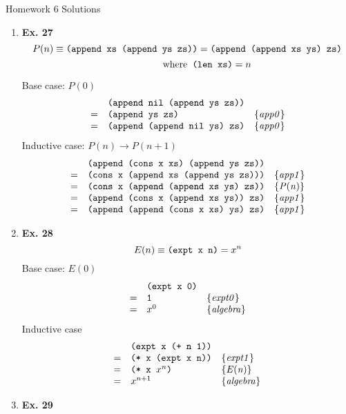 \documentclass[fleqn]{article}
\newenvironment{proof}
  {\[\begin{array}{lll}}
  {\end{array}\]}
\newcommand{\law}[1]{\{\mathit{#1}\}}
\renewcommand{\c}[1]{\mbox{\texttt{#1}}}
\begin{document}
  \begin{center}
    {\Large Homework 6 Solutions}
  \end{center}
  \begin{enumerate}
    \item {\bf Ex. 27}
      \[ P(n) \equiv \c{(append xs (append ys zs))} =
                     \c{(append (append xs ys) zs)} \]
                     \[ \qquad \qquad \mathrm{where} \c{ (len xs)} = n \]

      Base case: $P(0)$
      \begin{proof}
          & \c{(append nil (append ys zs))} & \\
        = & \c{(append ys zs)} & \law{app0} \\
        = & \c{(append (append nil ys) zs)} & \law{app0} \\
      \end{proof}
      Inductive case: $P(n) \to P(n + 1)$
      \begin{proof}
          & \c{(append (cons x xs) (append ys zs))} & \\
        = & \c{(cons x (append xs (append ys zs)))} & \law{app1} \\
        = & \c{(cons x (append (append xs ys) zs))} & \law{P(n)} \\
        = & \c{(append (cons x (append xs ys)) zs)} & \law{app1} \\
        = & \c{(append (append (cons x xs) ys) zs)} & \law{app1} \\
      \end{proof}
    \item {\bf Ex. 28}
      \[ E(n) \equiv \c{(expt x n)} = x^n \]
      Base case: $E(0)$
      \begin{proof}
          & \c{(expt x 0)} & \\
        = & \c{1} & \law{expt0} \\
        = & x^0 & \law{algebra} \\
      \end{proof}
      Inductive case
      \begin{proof}
          & \c{(expt x (+ n 1))} & \\
        = & \c{(* x (expt x n))} & \law{expt1} \\
        = & \c{(* x } x^n \c{)} & \law{E(n)} \\
        = & x^{n+1} & \law{algebra} \\
      \end{proof}
    \item {\bf Ex. 29}

\end{enumerate}
\end{document}
